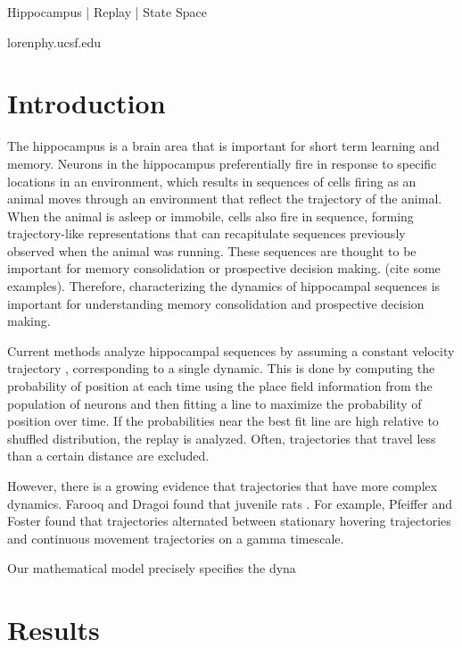 \documentclass[times, twoside]{zHenriquesLab-StyleBioRxiv}
\begin{document}
\begin{keywords}
Hippocampus | Replay | State Space
\end{keywords}

\begin{corrauthor}
loren\at phy.ucsf.edu
\end{corrauthor}

\section*{Introduction}
The hippocampus is a brain area that is important for short term learning and memory. Neurons in the hippocampus preferentially fire in response to specific locations in an environment, which results in sequences of cells firing as an animal moves through an environment that reflect the trajectory of the animal. When the animal is asleep or immobile, cells also fire in sequence, forming trajectory-like representations that can recapitulate sequences previously observed when the animal was running. These sequences are thought to be important for memory consolidation or prospective decision making. (cite some examples). Therefore, characterizing the dynamics of hippocampal sequences is important for understanding memory consolidation and prospective decision making.

Current methods analyze hippocampal sequences by assuming a constant velocity trajectory \cite{DavidsonHippocampalReplayExtended2009}, corresponding to a single dynamic. This is done by computing the probability of position at each time using the place field information from the population of neurons and then fitting a line to maximize the probability of position over time. If the probabilities near the best fit line are high relative to shuffled distribution, the replay is analyzed. Often, trajectories that travel less than a certain distance \cite{PfeifferAutoassociativedynamicsgeneration2015} are excluded.

However, there is a growing evidence that trajectories that have more complex dynamics. Farooq and Dragoi \cite{FarooqEmergencepreconfiguredplastic2019} found that juvenile rats . For example, Pfeiffer and Foster \cite{PfeifferAutoassociativedynamicsgeneration2015} found that trajectories alternated between stationary hovering trajectories and continuous movement trajectories on a gamma timescale. 

Our mathematical model precisely specifies the dyna

\section*{Results}
\end{document}
